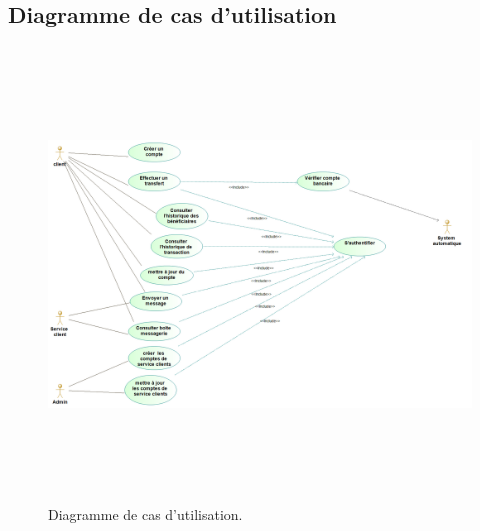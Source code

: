 \subsection{Diagramme de cas d’utilisation}
\begin{figure}[h!]
	\includegraphics[width=18cm, height=12cm]{./Template LaTeX/Images/use_case.png}
	\caption{Diagramme de cas d’utilisation.}
	\label{fig1:use_case}
\end{figure}
